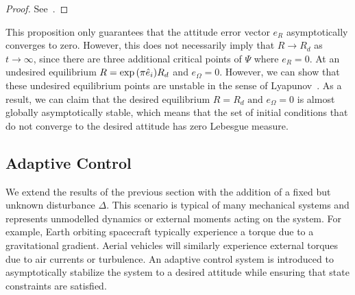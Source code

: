 \documentclass[letterpaper, 10 pt, conference]{ieeeconf}  %
\begin{document}
\begin{proof}
See~.
\end{proof}

This proposition only guarantees that the attitude error vector \( e_R \) asymptotically converges to zero.
However, this does not necessarily imply that \( R \to R_d \) as \( t \to \infty \), since there are three additional critical points of \( \Psi \) where \( e_R = 0 \).
At an undesired equilibrium \( R = \exp{ \ensuremath{\left( \pi \hat{e}_i \right)}} R_d \) and \( e_\Omega =0 \).
However, we can show that these undesired equilibrium points are unstable in the sense of Lyapunov~\cite{LeeITCST13}.
As a result, we can claim that the desired equilibrium \( R = R_d \text{ and } e_\Omega = 0 \) is almost globally asymptotically stable, which means that the set of initial conditions that do not converge to the desired attitude has zero Lebesgue measure.
 
\subsection{Adaptive Control}
We extend the results of the previous section with the addition of a fixed but unknown disturbance \( \Delta \).
This scenario is typical of many mechanical systems and represents unmodelled dynamics or external moments acting on the system.
For example, Earth orbiting spacecraft typically experience a torque due to a gravitational gradient.
Aerial vehicles will similarly experience external torques due to air currents or turbulence.
An adaptive control system is introduced to asymptotically stabilize the system to a desired attitude while ensuring that state constraints are satisfied. %
\end{document}
